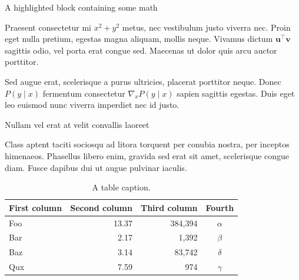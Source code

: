 \documentclass[final]{beamer}
\newlength{\colwidth}
\begin{document}
\begin{frame}[t]
\begin{columns}[t]
\begin{column}{\colwidth}
\begin{exampleblock}{A highlighted block containing some math}

                Praesent consectetur mi $x^2 + y^2$ metus, nec vestibulum justo viverra
                nec. Proin eget nulla pretium, egestas magna aliquam, mollis neque. Vivamus
                dictum $\mathbf{u}^\intercal\mathbf{v}$ sagittis odio, vel porta erat
                congue sed. Maecenas ut dolor quis arcu auctor porttitor.


                Sed augue erat, scelerisque a purus ultricies, placerat porttitor neque.
                Donec $P(y \mid x)$ fermentum consectetur $\nabla_x P(y \mid x)$ sapien
                sagittis egestas. Duis eget leo euismod nunc viverra imperdiet nec id
                justo.

            \end{exampleblock}

            \begin{block}{Nullam vel erat at velit convallis laoreet}

                Class aptent taciti sociosqu ad litora torquent per conubia nostra, per
                inceptos himenaeos. Phasellus libero enim, gravida sed erat sit amet,
                scelerisque congue diam. Fusce dapibus dui ut augue pulvinar iaculis.

                \begin{table}
                    \centering
                    \begin{tabular}{l r r c}
                        \toprule
                        \textbf{First column} & \textbf{Second column} & \textbf{Third column} & \textbf{Fourth} \\
                        \midrule
                        Foo                   & 13.37                  & 384,394               & $\alpha$        \\
                        Bar                   & 2.17                   & 1,392                 & $\beta$         \\
                        Baz                   & 3.14                   & 83,742                & $\delta$        \\
                        Qux                   & 7.59                   & 974                   & $\gamma$        \\
                        \bottomrule
                    \end{tabular}
                    \caption{A table caption.}
                \end{table}


\end{block}
\end{column}
\end{columns}
\end{frame}
\end{document}
